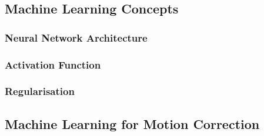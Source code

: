         
        
        \subsection{Machine Learning Concepts} \label{sec:machine_learning_concepts}
            
            
            \subsubsection{Neural Network Architecture} \label{sec:neural_network_architecture}
                
                
            \subsubsection{Activation Function} \label{sec:activation_function}
                
            
            \subsubsection{Regularisation} \label{sec:regularisation}
                
        
            
        
        \subsection{Machine Learning for Motion Correction} \label{sec:machine_learning_for_motion_correction}
            
